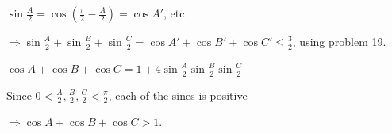   $\sin\frac{A}{2} = \cos\left(\frac{\pi}{2} - \frac{A}{2}\right) = \cos A'$, etc.

  $\Rightarrow \sin\frac{A}{2} + \sin\frac{B}{2} + \sin\frac{C}{2} = \cos A' + \cos B' + \cos C'\leq
  \frac{3}{2}$, using problem 19.
\item $\cos A + \cos B + \cos C = 1 + 4\sin\frac{A}{2}\sin\frac{B}{2}\sin\frac{C}{2}$

  Since $0 < \frac{A}{2}, \frac{B}{2}, \frac{C}{2} < \frac{\pi}{2}$, each of the sines is positive

  $\Rightarrow \cos A + \cos B + \cos C > 1$.
\stopitemize
